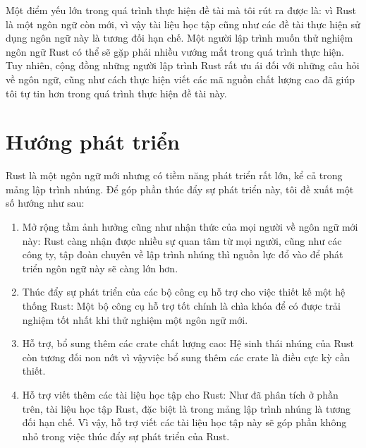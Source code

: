 Một điểm yếu lớn trong quá trình thực hiện đề tài mà tôi rút ra được là: vì Rust là một ngôn ngữ còn mới, vì vậy tài liệu học tập cũng như các đề tài thực hiện sử dụng ngôn ngữ này là tương đối hạn chế.
Một người lập trình muốn thử nghiệm ngôn ngữ Rust có thể sẽ gặp phải nhiều vướng mắt trong quá trình thực hiện.
Tuy nhiên, cộng đồng những người lập trình Rust rất ưu ái đối với những câu hỏi về ngôn ngữ, cũng như cách thực hiện viết các mã nguồn chất lượng cao đã giúp tôi tự tin hơn trong quá trình thực hiện đề tài này.

\section{Hướng phát triển}
Rust là một ngôn ngữ mới nhưng có tiềm năng phát triển rất lớn, kể cả trong mảng lập trình nhúng.
Để góp phần thúc đẩy sự phát triển này, tôi đề xuất một số hướng như sau:
\begin{enumerate}
    \item Mở rộng tầm ảnh hưởng cũng như nhận thức của mọi người về ngôn ngữ mới này:
        Rust càng nhận được nhiều sự quan tâm từ mọi người, cũng như các công ty, tập đoàn chuyên về lập trình nhúng thì nguồn lực đổ vào để phát triển ngôn ngữ này sẽ càng lớn hơn.
    \item Thúc đẩy sự phát triển của các bộ công cụ hỗ trợ cho việc thiết kế một hệ thống Rust:
        Một bộ công cụ hỗ trợ tốt chính là chìa khóa để có được trải nghiệm tốt nhất khi thử nghiệm một ngôn ngữ mới.
    \item Hỗ trợ, bổ sung thêm các crate chất lượng cao:
        Hệ sinh thái nhúng của Rust còn tương đối non nớt vì vậyviệc bổ sung thêm các crate là điều cực kỳ cần thiết.
    \item Hỗ trợ viết thêm các tài liệu học tập cho Rust:
        Như đã phân tích ở phần trên, tài liệu học tập Rust, đặc biệt là trong mảng lập trình nhúng là tương đối hạn chế.
        Vì vậy, hỗ trợ viết các tài liệu học tập này sẽ góp phần không nhỏ trong việc thúc đẩy sự phát triển của Rust.
\end{enumerate}
